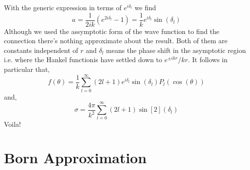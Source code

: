 With the generic expression in terms of $e^{i \delta_{l}}$ we find
\begin{equation}
a_{} = \frac{1}{2ik}(e^{2i \delta_{l}} - 1) = \frac{1}{k} e^{i \delta_{l}} \sin(\delta_{l})
\end{equation}
Although we used the assymptotic form of the wave function to find the connection there's nothing approximate about the result. Both of them are constants independent of $r$ and $\delta_{l}$ means the phase shift in the asymptotic region i.e. where the Hankel functionis have settled down to $e^{\pm ikr}/kr$. It follows in particular that,
\begin{equation}
f(\theta) = \frac{1}{k}\sum_{l=0}^{\infty}(2l + 1)e^{i \delta_{l}} \sin(\delta_{l}) P_{l}(\cos(\theta)) 
\end{equation}
and,
\begin{equation}
\sigma = \frac{4 \pi}{k^{2}} \sum_{l=0}^{\infty}(2l + 1) \sin[2](\delta_{l})
\end{equation}
Voila!
\section{Born Approximation}
